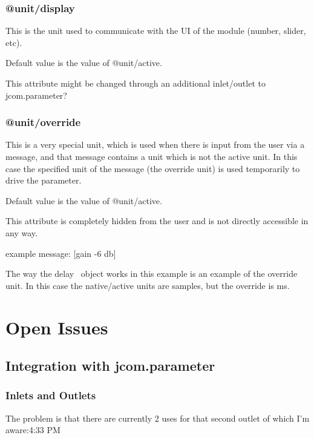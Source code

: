 \documentclass[]{article}
\begin{document}
\subsubsection{@unit/display}

This is the unit used to communicate with the UI of the module (number, slider, etc).

Default value is the value of @unit/active.

This attribute might be changed through an additional inlet/outlet to jcom.parameter?


\subsubsection{@unit/override}

This is a very special unit, which is used when there is input from the user via a message, and that message contains a unit which is not the active unit.  In this case the specified unit of the message (the override unit) is used temporarily to drive the parameter.

Default value is the value of @unit/active.

This attribute is completely hidden from the user and is not directly accessible in any way.

example message:     [gain -6 db]

The way the delay~ object works in this example is an example of the override unit.  In this case the native/active units are samples, but the override is ms.






\section{Open Issues}

\subsection{Integration with jcom.parameter}

\subsubsection{Inlets and Outlets}

The problem is that there are currently 2 uses for that second outlet of which I'm aware:4:33 PM
 
\end{document}
